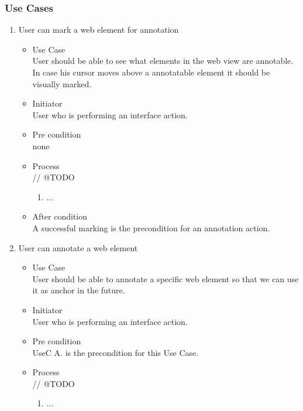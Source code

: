 \subsubsection{Use Cases}
\begin{enumerate}[UseC. A.]
\item  {User can mark a web element for annotation}
\begin{itemize}
	\item Use Case \\
User should be able to see what elements in the web view are annotable. In case his cursor moves above a annotatable element it should be visually marked.
	\item Initiator \\
User who is performing an interface action.
	\item Pre condition \\ 
none
	\item Process \\
// @TODO \\
	\begin{enumerate}
		\item ...
	\end{enumerate}
	
	\item After condition \\ 
A successful marking is the precondition for an annotation action.
\end{itemize}

\item {User can annotate a web element}
\begin{itemize}
	\item Use Case \\
User should be able to annotate a specific web element so that we can use it as anchor in the future.

	\item Initiator \\
User who is performing an interface action.

	\item Pre condition \\ 
UseC A. is the precondition for this Use Case.	
	\item Process \\
// @TODO \\
	\begin{enumerate}
		\item ...
	\end{enumerate}
	

\end{itemize}
\end{enumerate}
